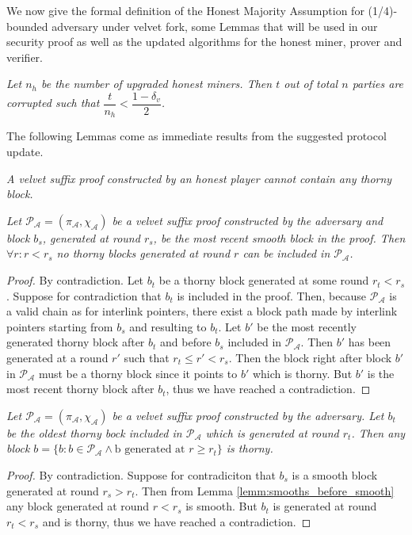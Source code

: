 We now give the formal definition of the Honest Majority Assumption for (1/4)-bounded adversary under velvet fork, some Lemmas that will be used in our security proof as well as the updated algorithms for the honest miner, prover and verifier.
\begin{definition}
	\textit{Let $n_h$ be the number of upgraded honest miners. Then $t$ out of total $n$ parties are corrupted such that $\dfrac{t}{n_h} < \dfrac{1 - \delta_v}{2} $.}
	\label{defn:velvet_honest_majority}
\end{definition}

The following Lemmas come as immediate results from the suggested protocol
update.\\

\begin{lemma}
	\textit{A velvet suffix proof constructed by an honest player cannot contain
	any thorny block.}
	\label{lemm:smooth_honest_suffix}
\end{lemma}

\begin{lemma}
	\textit{Let $\mathcal{P_A} = (\pi_\mathcal{A}, \chi_\mathcal{A})$
	be a velvet suffix proof constructed by the adversary and block $b_s$, generated at round $r_s$, be the most recent smooth block in the proof. Then $\forall r:r < r_s$ no thorny blocks generated at round $r$ can be included in $\mathcal{P_A}$.}
	\label{lemm:smooths_before_smooth}
\end{lemma}
\begin{proof}
By contradiction. Let $b_t$ be a thorny block generated at some round $r_t < r_s$. Suppose for contradiction that $b_t$ is included in the proof. Then, because $\mathcal{P_A}$ is a valid chain as for interlink pointers, there exist a block path made by interlink pointers starting from $b_s$ and resulting to $b_t$. Let $b'$ be the most recently generated thorny block after $b_t$ and before $b_s$ included in $\mathcal{P_A}$. Then $b'$ has been generated at a round $r'$ such that $r_t \leq r' < r_s$. Then the block right after block $b'$ in $\mathcal{P_A}$ must be a thorny block since it points to $b'$ which is thorny. But $b'$ is the most recent thorny block after $b_t$, thus we have reached a contradiction.
\end{proof}

\begin{lemma}
	\textit{Let $\mathcal{P_A} = (\pi_\mathcal{A}, \chi_\mathcal{A})$ be a velvet suffix proof constructed by the adversary. Let $b_t$ be the oldest thorny bock included in $\mathcal{P_A}$ which is generated at round $r_t$. Then any block $b = \{b: b \in \mathcal{P_A} \wedge \text{b generated at }r \geq r_t \}$ is thorny.}
	\label{lemm:thorny_after_thorny}
\end{lemma}
\begin{proof}
By contradiction. Suppose for contradiciton that $b_s$ is a smooth block generated at round $r_s > r_t$. Then from Lemma \ref{lemm:smooths_before_smooth} any block generated at round $r < r_s$ is smooth. But $b_t$ is generated at round $r_t < r_s$ and is thorny, thus we have reached a contradiction.
\end{proof}

